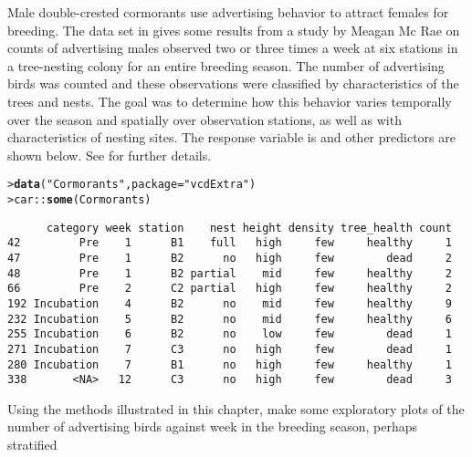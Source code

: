 \documentclass[11pt]{report}\usepackage[]{graphicx}\usepackage[]{color}
\makeatletter
\newcommand{\hlstr}[1]{\textcolor[rgb]{0.192,0.494,0.8}{#1}}%
\newcommand{\hlopt}[1]{\textcolor[rgb]{0,0,0}{#1}}%
\newcommand{\hlstd}[1]{\textcolor[rgb]{0.345,0.345,0.345}{#1}}%
\newcommand{\hlkwc}[1]{\textcolor[rgb]{0.333,0.667,0.333}{#1}}%
\newcommand{\hlkwd}[1]{\textcolor[rgb]{0.737,0.353,0.396}{\textbf{#1}}}%
\newenvironment{kframe}{%
 \def\at@end@of@kframe{}%
 \ifinner\ifhmode%
  \def\at@end@of@kframe{\end{minipage}}%
  \begin{minipage}{\columnwidth}%
 \fi\fi%
 \def\FrameCommand##1{\hskip\@totalleftmargin \hskip-\fboxsep
 \colorbox{shadecolor}{##1}\hskip-\fboxsep
     \hskip-\linewidth \hskip-\@totalleftmargin \hskip\columnwidth}%
 \MakeFramed {\advance\hsize-\width
   \@totalleftmargin\z@ \linewidth\hsize
   \@setminipage}}%
 {\par\unskip\endMakeFramed%
 \at@end@of@kframe}
\newenvironment{knitrout}{}{} %
\renewenvironment{knitrout}{\small\renewcommand{\baselinestretch}{.85}}{} %
\makeatother
\begin{document}
\begin{Exercises}
  \exercise Male double-crested cormorants use advertising behavior to attract females for breeding.
	The  data set in  gives some results from a study by
	Meagan Mc Rae \citeyearpar{McRae:2015} on counts of advertising males observed two or three times a week
	at six stations in a tree-nesting colony for an entire breeding season.
	The number of advertising birds was counted and these observations were classified
	by characteristics of the trees and nests. The goal was to determine how this behavior varies 
	temporally over the season and spatially over observation stations, as well as with 
	characteristics of nesting sites.
	The response variable is 
	and other predictors are shown below.  See 
	for further details.
\begin{knitrout}
\color{fgcolor}\begin{kframe}
\begin{alltt}
\hlstd{> }\hlkwd{data}\hlstd{(}\hlstr{"Cormorants"}\hlstd{,} \hlkwc{package} \hlstd{=} \hlstr{"vcdExtra"}\hlstd{)}
\hlstd{> }\hlstd{car}\hlopt{::}\hlkwd{some}\hlstd{(Cormorants)}
\end{alltt}
\begin{verbatim}
      category week station    nest height density tree_health count
42         Pre    1      B1    full   high     few     healthy     1
47         Pre    1      B2      no   high     few        dead     2
48         Pre    1      B2 partial    mid     few     healthy     2
66         Pre    2      C2 partial   high     few     healthy     2
192 Incubation    4      B2      no    mid     few     healthy     9
232 Incubation    5      B2      no    mid     few     healthy     6
255 Incubation    6      B2      no    low     few        dead     1
271 Incubation    7      C3      no   high     few        dead     1
280 Incubation    7      B1      no   high     few     healthy     1
338       <NA>   12      C3      no   high     few        dead     3
\end{verbatim}
\end{kframe}
\end{knitrout}
	\begin{enumerate*}
		\item Using the methods illustrated in this chapter, make some exploratory plots of the
		number of advertising birds against week in the breeding season, perhaps stratified

\end{enumerate*}
\end{Exercises}
\end{document}
